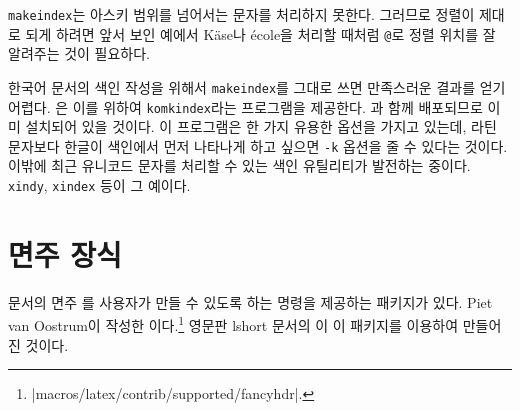 \texttt{makeindex}는 아스키 범위를 넘어서는 문자를 처리하지 못한다. 그러므로 정렬이 제대로 되게 하려면 앞서 보인 예에서 K\"ase나 \'ecole을 처리할 때처럼 \verb|@|로 정렬 위치를 잘 알려주는 것이 필요하다.

\medskip

\noindent [역자의 보충]
한국어 문서의 색인 작성을 위해서 \texttt{makeindex}를 그대로 쓰면 만족스러운 결과를 얻기 어렵다. \koTeX 은 이를 위하여 \texttt{komkindex}라는 프로그램을 제공한다. \koTeX 과 함께 배포되므로 이미 설치되어 있을 것이다. 이 프로그램은 한 가지 유용한 옵션을 가지고 있는데, 라틴 문자보다 한글이 색인에서 먼저 나타나게 하고 싶으면 \verb|-k| 옵션을 줄 수 있다는 것이다.
이밖에 최근 유니코드 문자를 처리할 수 있는 색인 유틸리티가 발전하는 중이다. \texttt{xindy}, \texttt{xindex} 등이 그 예이다.


\section{면주 장식}
\label{sec:fancy}

문서의 면주%
%
를 사용자가 만들 수 있도록 하는 명령을 제공하는 패키지가 있다. Piet van Oostrum이 작성한 이다.\footnote{\CTAN|macros/latex/contrib/supported/fancyhdr|.}
영문판 lshort 문서의 이 이 패키지를 이용하여 만들어진 것이다.%

